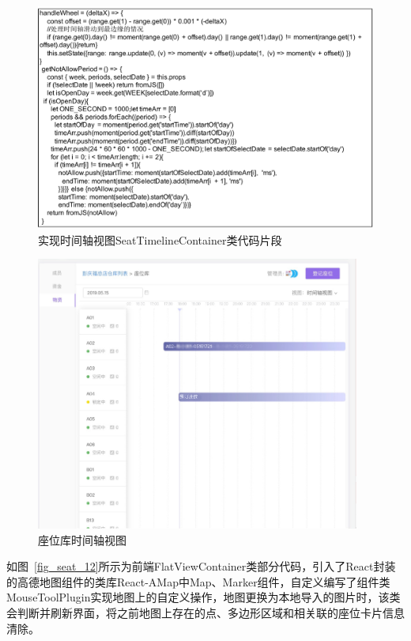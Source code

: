 \begin{figure}[htbp!]
    \centering
    \includegraphics[width=4.5in]{FIGs/chapter4/11.pdf}
    \caption{实现时间轴视图SeatTimelineContainer类代码片段}\label{fig_seat_11}
\end{figure}

\begin{figure}[htbp!]
    \centering
    \includegraphics[width=4.2in]{FIGs/chapter4/seat_time_view.pdf}
    \caption{座位库时间轴视图}\label{fig_seat_time_view}
\end{figure}

如图~\ref{fig_seat_12}所示为前端FlatViewContainer类部分代码，引入了React封装的高德地图组件的类库React-AMap中Map、Marker组件，自定义编写了组件类MouseToolPlugin实现地图上的自定义操作，地图更换为本地导入的图片时，该类会判断并刷新界面，将之前地图上存在的点、多边形区域和相关联的座位卡片信息清除。

